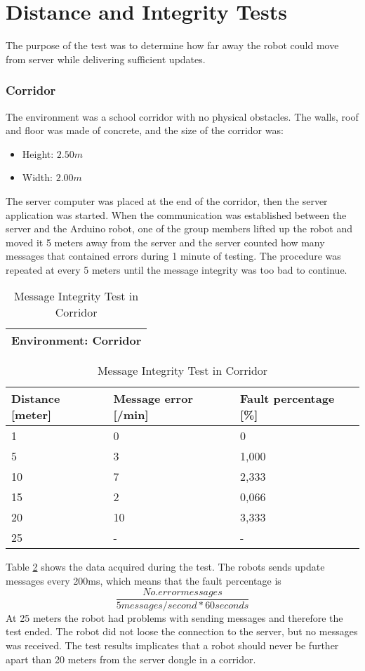 \newpage
\section{Distance and Integrity Tests}
\label{sec:testcom}
The purpose of the test was to determine how far away the robot could move from server while delivering sufficient updates.
\subsubsection{Corridor}
The environment was a school corridor with no physical obstacles. The walls, roof and floor was made of concrete, and the size of the corridor was:
\begin{itemize}
    \item Height: $2.50 m$
    \item Width: $2.00 m$
\end{itemize}
The server computer was placed at the end of the corridor, then the server application was started. When the communication was established between the server and the Arduino robot, one of the group members lifted up the robot and moved it 5 meters away from the server and the server counted how many messages that contained errors during 1 minute of testing. The procedure was repeated at every 5 meters until the message integrity was too bad to continue.
\newpage
{}

\begin{table}[ht]
\begin{center}
 \begin{tabular}{|p{100pt}|} 
 \hline
 Environment: \textbf{Corridor}\\
 \hline
 \end{tabular}
 \begin{tabular}{|p{90pt}|p{100pt}|p{90pt}|}
 \hline
 Distance [meter] & Message error [/min] &  Fault percentage [\%]\\
 \hline
 1		        &   0 		&	0    \\
 5              &   3  		&	1,000\\
 10             &   7  		&	2,333\\
 15				&	2 		&	0,066\\
 20				&	10 		&	3,333\\
 25				&	-		&	-    \\
 \hline
\end{tabular}
\end{center}
\caption{Message Integrity Test in Corridor}
\label{tab:messintegritycorr}
\end{table}
Table \ref{tab:messintegritycorr} shows the data acquired during the test. The robots sends update messages every 200ms, which means that the fault percentage is $$\frac{No. error messages}{5 messages/second * 60 seconds}$$
At 25 meters the robot had problems with sending messages and therefore the test ended. The robot did not loose the connection to the server, but no messages was received. The test results implicates that a robot should never be further apart than 20 meters from the server dongle in a corridor.

